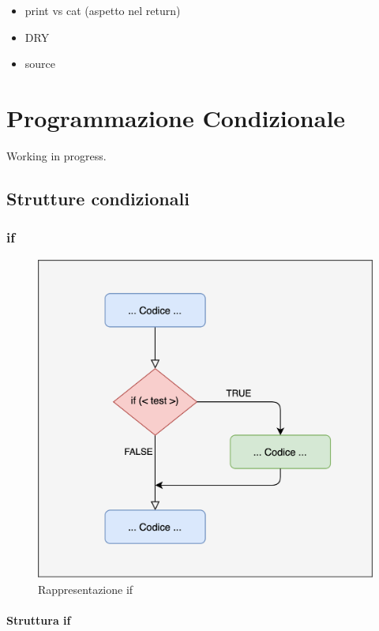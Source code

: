 \documentclass[
]{book}
\providecommand{\tightlist}{%
  \setlength{\itemsep}{0pt}\setlength{\parskip}{0pt}}
\begin{document}
\begin{itemize}
\tightlist
\item
  print vs cat (aspetto nel return)
\item
  DRY
\item
  source
\end{itemize}

\hypertarget{coditionals}{%
\chapter{Programmazione Condizionale}\label{coditionals}}

Working in progress.

\hypertarget{strutture-condizionali}{%
\section{Strutture condizionali}\label{strutture-condizionali}}

\hypertarget{if}{%
\subsection{if}\label{if}}

\begin{figure}

{\centering \includegraphics[width=0.65\linewidth]{images/if_chart} 

}

\caption{Rappresentazione if}\label{fig:plot-if-chart}
\end{figure}

\hypertarget{struttura-if}{%
\subsubsection*{Struttura if}\label{struttura-if}}
\end{document}
